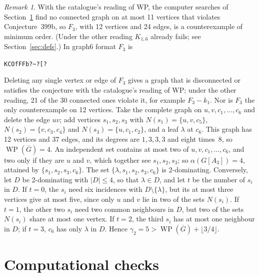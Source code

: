 \documentclass[11pt,a4paper]{article}
\theoremstyle{definition}
\theoremstyle{remark}
\newtheorem{remark}[theorem]{Remark}
\newcommand{\Gc}{\overline{G}}
\newcommand{\WP}{\operatorname{WP}}
\newcommand{\flr}[1]{\lfloor #1\rfloor}
\begin{document}
\begin{remark}\label{rem:order}
With the catalogue's reading of WP, the computer searches of Section~\ref{sec:verify} find no
connected graph on at most 11 vertices that violates Conjecture~399b, so $F_3$, with 12 vertices
and 24 edges, is a counterexample of minimum order. (Under the other reading $K_{1,6}$ already
fails; see Section~\ref{sec:defs}.) In graph6 format $F_3$ is
\begin{center}
\texttt{KCOfFFb?\textasciitilde?[?}
\end{center}
Deleting any single vertex or edge of $F_3$ gives a graph that is disconnected or satisfies the
conjecture with the catalogue's reading of WP; under the other reading, 21 of the 30 connected
ones violate it, for example $F_3-k_1$. Nor is $F_3$ the only counterexample on 12 vertices. Take
the complete graph on $u,v,c_1,\dots,c_6$ and delete the edge $uv$; add vertices $s_1,s_2,s_3$ with
$N(s_1)=\{u,v,c_5\}$, $N(s_2)=\{v,c_3,c_4\}$ and $N(s_3)=\{u,c_1,c_2\}$, and a leaf $\lambda$ at
$c_6$. This graph has 12 vertices and 37 edges, and its degrees are $1,3,3,3$ and eight times~$8$,
so $\WP(\Gc)=4$. An independent set contains at most two of $u,v,c_1,\dots,c_6$, and two only if
they are $u$ and $v$, which together see $s_1,s_2,s_3$; so $\alpha(G[A_3])=4$, attained by
$\{s_1,s_2,s_3,c_6\}$. The set $\{\lambda,s_1,s_2,s_3,c_6\}$ is 2-dominating. Conversely, let $D$ be
2-dominating with $|D|\le 4$, so that $\lambda\in D$, and let $t$ be the number of $s_i$ in $D$. If
$t=0$, the $s_i$ need six incidences with $D\setminus\{\lambda\}$, but its at most three vertices
give at most five, since only $u$ and $v$ lie in two of the sets $N(s_i)$. If $t=1$, the other two
$s_i$ need two common neighbours in $D$, but two of the sets $N(s_i)$ share at most one vertex. If
$t=2$, the third $s_i$ has at most one neighbour in $D$; if $t=3$, $c_6$ has only $\lambda$ in $D$.
Hence $\gamma_2=5>\WP(\Gc)+\flr{3/4}$.
\end{remark}

\section{Computational checks}\label{sec:verify}
\end{document}

